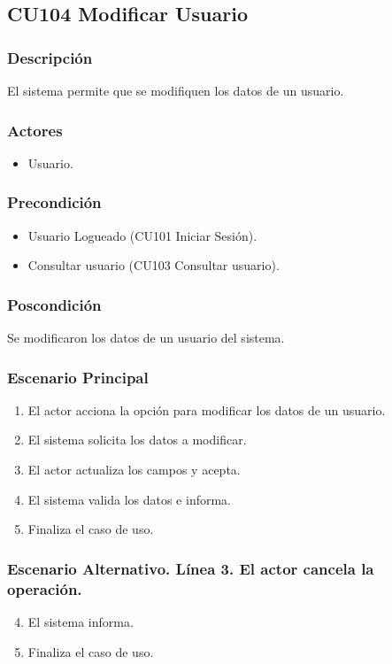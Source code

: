 \subsection{CU104 Modificar Usuario}
\subsubsection{Descripci\'{o}n}
El sistema permite que se modifiquen los datos de un usuario.
\subsubsection{Actores}
\begin{itemize}
\item Usuario.
\end{itemize}
\subsubsection{Precondici\'{o}n}
\begin{itemize}
\item Usuario Logueado (CU101 Iniciar Sesi\'{o}n).
\item Consultar usuario (CU103 Consultar usuario).
\end{itemize}
\subsubsection{Poscondici\'{o}n}
Se modificaron los datos de un usuario del sistema.
\subsubsection{Escenario Principal}
\begin{enumerate}
\item El actor acciona la opci\'{o}n para modificar los datos de un usuario.
\item El sistema solicita los datos a modificar.
\item El actor actualiza los campos y acepta.
\item El sistema valida los datos e informa.
\item Finaliza el caso de uso.
\end{enumerate}
\subsubsection{Escenario Alternativo. L\'{i}nea 3. El actor cancela la operaci\'{o}n.}
\begin{enumerate}
\setcounter{enumi}{3}
\item El sistema informa.
\item Finaliza el caso de uso.
\end{enumerate}
